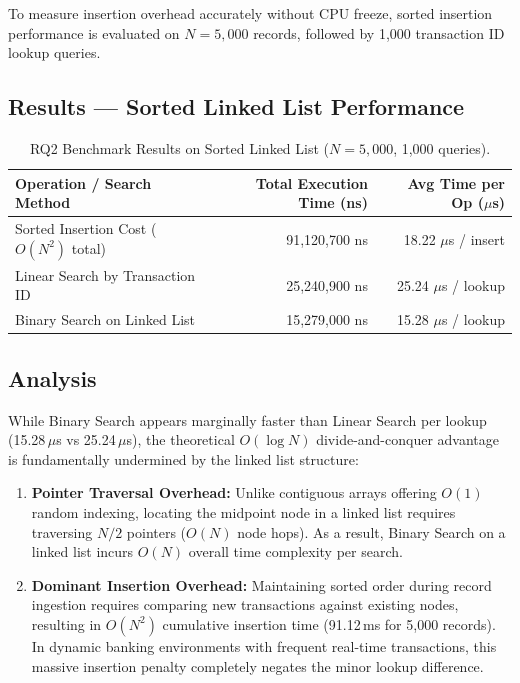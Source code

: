 \documentclass[11pt]{article}
\begin{document}
To measure insertion overhead accurately without CPU freeze, sorted insertion performance is evaluated on $N=5,000$ records, followed by 1,000 transaction ID lookup queries.

\subsection{Results --- Sorted Linked List Performance}

\begin{table}[htbp]
\centering
\small
\begin{tabular}{lrr}
\toprule
\textbf{Operation / Search Method} & \textbf{Total Execution Time (ns)} & \textbf{Avg Time per Op ($\mu$s)} \\
\midrule
Sorted Insertion Cost ($O(N^2)$ total) & 91,120,700 ns & 18.22 $\mu$s / insert \\
Linear Search by Transaction ID & 25,240,900 ns & 25.24 $\mu$s / lookup \\
Binary Search on Linked List & 15,279,000 ns & 15.28 $\mu$s / lookup \\
\bottomrule
\end{tabular}
\caption{RQ2 Benchmark Results on Sorted Linked List ($N=5,000$, 1,000 queries).}
\label{tab:rq2}
\end{table}

\subsection{Analysis}
While Binary Search appears marginally faster than Linear Search per lookup (15.28\,$\mu$s vs 25.24\,$\mu$s), the theoretical $O(\log N)$ divide-and-conquer advantage is fundamentally undermined by the linked list structure:
\begin{enumerate}[leftmargin=1.5em]
    \item \textbf{Pointer Traversal Overhead:} Unlike contiguous arrays offering $O(1)$ random indexing, locating the midpoint node in a linked list requires traversing $N/2$ pointers ($O(N)$ node hops). As a result, Binary Search on a linked list incurs $O(N)$ overall time complexity per search.
    \item \textbf{Dominant Insertion Overhead:} Maintaining sorted order during record ingestion requires comparing new transactions against existing nodes, resulting in $O(N^2)$ cumulative insertion time (91.12\,ms for 5,000 records). In dynamic banking environments with frequent real-time transactions, this massive insertion penalty completely negates the minor lookup difference.
\end{enumerate}
\end{document}
